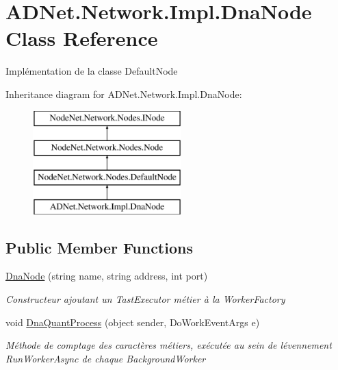 \hypertarget{class_a_d_net_1_1_network_1_1_impl_1_1_dna_node}{}\section{A\+D\+Net.\+Network.\+Impl.\+Dna\+Node Class Reference}
\label{class_a_d_net_1_1_network_1_1_impl_1_1_dna_node}


Implémentation de la classe Default\+Node  


Inheritance diagram for A\+D\+Net.\+Network.\+Impl.\+Dna\+Node\+:\begin{figure}[H]
\begin{center}
\leavevmode
\includegraphics[height=4.000000cm]{class_a_d_net_1_1_network_1_1_impl_1_1_dna_node}
\end{center}
\end{figure}
\subsection*{Public Member Functions}
\begin{DoxyCompactItemize}
\item 
\hyperlink{class_a_d_net_1_1_network_1_1_impl_1_1_dna_node_ad04904adf2467b4c471a3a8755c6c3ab}{Dna\+Node} (string name, string address, int port)
\begin{DoxyCompactList}\small\item\em Constructeur ajoutant un Tast\+Executor métier à la Worker\+Factory \end{DoxyCompactList}\item 
void \hyperlink{class_a_d_net_1_1_network_1_1_impl_1_1_dna_node_aa50bf7c4c18416588b578d1ee2ee8b87}{Dna\+Quant\+Process} (object sender, Do\+Work\+Event\+Args e)
\begin{DoxyCompactList}\small\item\em Méthode de comptage des caractères métiers, exécutée au sein de l\textquotesingle{}évennement Run\+Worker\+Async de chaque Background\+Worker \end{DoxyCompactList}\end{DoxyCompactItemize}
